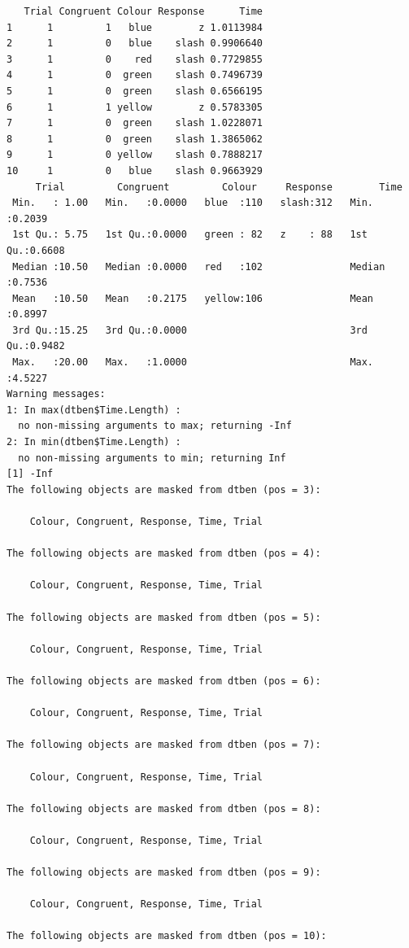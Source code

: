 \documentclass{article}
\begin{document}
\begin{verbatim}
   Trial Congruent Colour Response      Time
1      1         1   blue        z 1.0113984
2      1         0   blue    slash 0.9906640
3      1         0    red    slash 0.7729855
4      1         0  green    slash 0.7496739
5      1         0  green    slash 0.6566195
6      1         1 yellow        z 0.5783305
7      1         0  green    slash 1.0228071
8      1         0  green    slash 1.3865062
9      1         0 yellow    slash 0.7888217
10     1         0   blue    slash 0.9663929
     Trial         Congruent         Colour     Response        Time       
 Min.   : 1.00   Min.   :0.0000   blue  :110   slash:312   Min.   :0.2039  
 1st Qu.: 5.75   1st Qu.:0.0000   green : 82   z    : 88   1st Qu.:0.6608  
 Median :10.50   Median :0.0000   red   :102               Median :0.7536  
 Mean   :10.50   Mean   :0.2175   yellow:106               Mean   :0.8997  
 3rd Qu.:15.25   3rd Qu.:0.0000                            3rd Qu.:0.9482  
 Max.   :20.00   Max.   :1.0000                            Max.   :4.5227
Warning messages:
1: In max(dtben$Time.Length) :
  no non-missing arguments to max; returning -Inf
2: In min(dtben$Time.Length) :
  no non-missing arguments to min; returning Inf
[1] -Inf
The following objects are masked from dtben (pos = 3):

    Colour, Congruent, Response, Time, Trial

The following objects are masked from dtben (pos = 4):

    Colour, Congruent, Response, Time, Trial

The following objects are masked from dtben (pos = 5):

    Colour, Congruent, Response, Time, Trial

The following objects are masked from dtben (pos = 6):

    Colour, Congruent, Response, Time, Trial

The following objects are masked from dtben (pos = 7):

    Colour, Congruent, Response, Time, Trial

The following objects are masked from dtben (pos = 8):

    Colour, Congruent, Response, Time, Trial

The following objects are masked from dtben (pos = 9):

    Colour, Congruent, Response, Time, Trial

The following objects are masked from dtben (pos = 10):


\end{verbatim}
\end{document}
